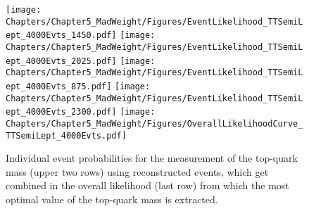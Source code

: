 \begin{figure}[h!tb]
 \centering
 \texttt{[image: Chapters/Chapter5\_MadWeight/Figures/EventLikelihood\_TTSemiLept\_4000Evts\_1450.pdf]} \vspace{0.2cm}
 \texttt{[image: Chapters/Chapter5\_MadWeight/Figures/EventLikelihood\_TTSemiLept\_4000Evts\_2025.pdf]} \vspace{0.2cm}
 \texttt{[image: Chapters/Chapter5\_MadWeight/Figures/EventLikelihood\_TTSemiLept\_4000Evts\_875.pdf]} \vspace{0.2cm}
 \texttt{[image: Chapters/Chapter5\_MadWeight/Figures/EventLikelihood\_TTSemiLept\_4000Evts\_2300.pdf]} \vspace{0.2cm}
 \texttt{[image: Chapters/Chapter5\_MadWeight/Figures/OverallLikelihoodCurve\_TTSemiLept\_4000Evts.pdf]}
 \caption{Individual event probabilities for the measurement of the top-quark mass (upper two rows) using reconstructed events, which get combined in the overall likelihood (last row) from which the most optimal value of the top-quark mass is extracted.} \label{fig::EvtProbsMT}
\end{figure}

%
